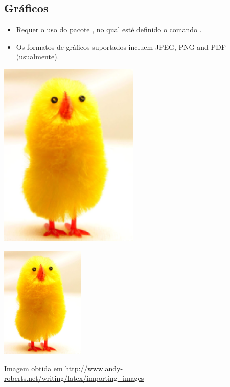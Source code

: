 \documentclass{beamer}
\begin{document}
\subsection{Gráficos}

\begin{frame}[fragile]{\insertsubsection}
	\begin{itemize}
		\item Requer o uso do pacote , no qual esté definido o 
		comando .
		\item Os formatos de gráficos suportados incluem JPEG, PNG and PDF (usualmente). 
	\end{itemize}
	\begin{exampletwouptiny}
		\includegraphics[width=0.5\textwidth]
		{big_chick}
		
		\includegraphics[width=0.3\textwidth,
						angle=270]{big_chick}
	\end{exampletwouptiny}
	
	\tiny{Imagem obtida em \url{http://www.andy-roberts.net/writing/latex/importing_images}}
\end{frame}
\end{document}
